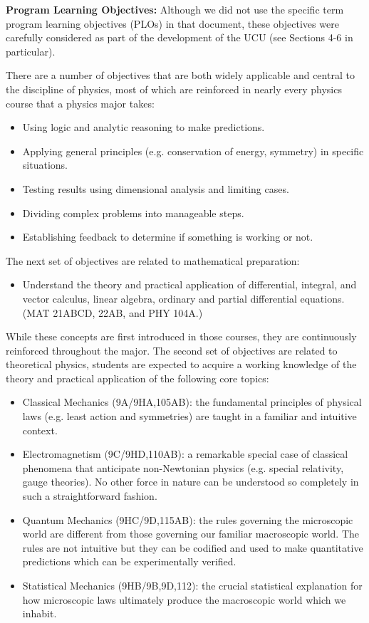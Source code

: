 \documentclass[12pt]{article}
\begin{document}
\noindent
{\bf Program Learning Objectives:} Although we did not use the
specific term program learning objectives (PLOs) in that document,
these objectives were carefully considered as part of the development
of the UCU (see Sections 4-6 in particular).

There are a number of objectives that are both widely applicable and
central to the discipline of physics, most of which are reinforced in
nearly every physics course that a physics major  takes:
\begin{itemize}
 \item Using logic and analytic reasoning to make predictions.
 \item Applying general principles (e.g. conservation of energy, symmetry) in specific situations. 
 \item Testing results using dimensional analysis and limiting cases. 
 \item Dividing complex problems into manageable steps.
 \item Establishing feedback to determine if something is working or not.
\end{itemize}  
The next set of objectives are related to mathematical preparation:
\begin{itemize}
\item Understand the theory and practical application of differential, integral, and vector calculus, linear algebra, ordinary and partial differential equations.  (MAT 21ABCD, 22AB, and PHY 104A.)
\end{itemize}
While these concepts are first introduced in those courses, they are continuously reinforced throughout the major.  The second set of objectives are related to theoretical physics, students are expected to acquire a working knowledge of the theory and practical application of the following core topics:
\begin{itemize}
 \item Classical Mechanics (9A/9HA,105AB): the fundamental principles of physical laws
  (e.g. least action and symmetries) are taught in a familiar and intuitive context. 
\item Electromagnetism (9C/9HD,110AB): a remarkable special case of classical
  phenomena that anticipate non-Newtonian physics (e.g. special
  relativity, gauge theories).  No other force in nature can be understood so
  completely in such a straightforward fashion.  
\item Quantum Mechanics (9HC/9D,115AB): the rules governing the microscopic world are
  different from those governing our familiar macroscopic world.  The
  rules are not intuitive but they can be codified and used to make
  quantitative predictions which can be experimentally verified.
\item Statistical Mechanics (9HB/9B,9D,112): the crucial statistical explanation for how
  microscopic laws ultimately produce the macroscopic world which we inhabit.
\end{itemize}
\end{document}
